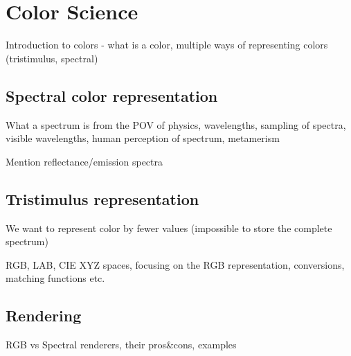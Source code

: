 \chapter{Color Science}

Introduction to colors - what is a color, multiple ways of representing colors (tristimulus, spectral)

\section{Spectral color representation}
What a spectrum is from the POV of physics, wavelengths, sampling of spectra, visible wavelengths, human perception of spectrum, metamerism

Mention reflectance/emission spectra

\section{Tristimulus representation}
We want to represent color by fewer values (impossible to store the complete spectrum)

RGB, LAB, CIE XYZ spaces, focusing on the RGB representation, conversions, matching functions etc.

\section{Rendering}
RGB vs Spectral renderers, their pros\&cons, examples
